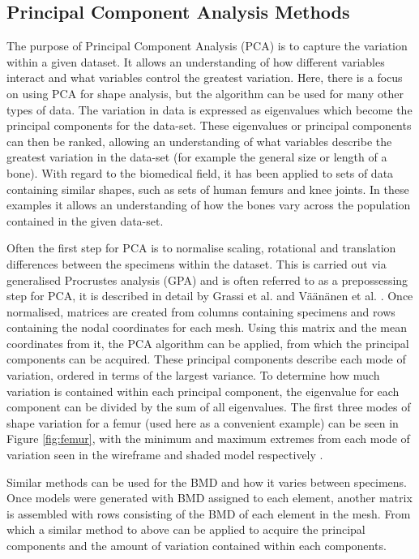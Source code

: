 \subsection{Principal Component Analysis Methods}\label{pca-methods}

The purpose of Principal Component Analysis (PCA) is to capture the variation within a given dataset.
It allows an understanding of how different variables interact and what variables control the greatest variation.
Here, there is a focus on using PCA for shape analysis, but the algorithm can be used for many other types of data.
The variation in data is expressed as eigenvalues which become the principal components for the data-set.
These eigenvalues or principal components can then be ranked, allowing an understanding of what variables describe the greatest variation in the data-set (for example the general size or length of a bone).
With regard to the biomedical field, it has been applied to sets of data containing similar shapes, such as sets of human femurs and knee joints.
In these examples it allows an understanding of how the bones vary across the population contained in the given data-set.


Often the first step for PCA is to normalise scaling, rotational and
translation differences between the specimens within the dataset. This
is carried out via generalised Procrustes analysis (GPA) and is often
referred to as a prepossessing step for PCA, it is described in detail
by Grassi et al. \cite{Grassi2014} and V{\"a}{\"a}n{\"a}nen et al. \cite{Vaananen2015}.
Once
normalised,
matrices are created from columns containing specimens and rows
containing the nodal coordinates for each mesh. Using this matrix and
the mean coordinates from it, the PCA algorithm can be applied, from
which the principal components can be acquired. These principal
components describe each mode of variation, ordered in terms of the
largest variance. To determine how much variation is contained within
each principal component, the eigenvalue for each component can be
divided by the sum of all eigenvalues. The first three modes of shape
variation for a femur (used here as a convenient example) can be seen in Figure \ref{fig:femur}, with the
minimum and
maximum extremes from each mode of variation seen in the wireframe and
shaded model respectively \cite{Grassi2014}.

Similar methods can be used for the BMD and how it varies between
specimens. Once models were generated with BMD assigned to each element,
another matrix is assembled with rows consisting of the BMD of each
element in the mesh. From which a similar method to above can be applied
to acquire the principal components and the amount of variation
contained within each components.

